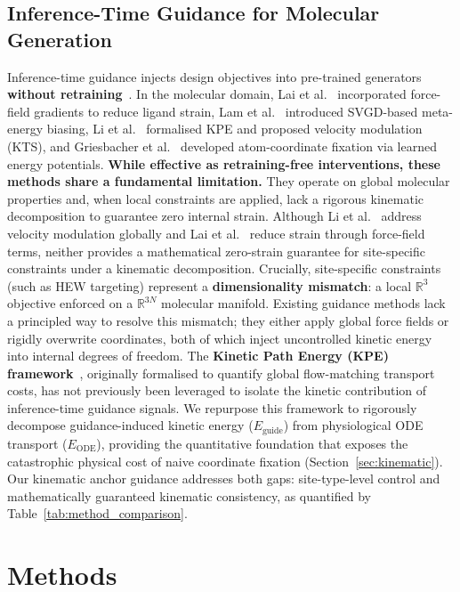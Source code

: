 \documentclass{article}
\newcommand{\reals}{\ensuremath{\mathbb{R}}}
\begin{document}
\subsection{Inference-Time Guidance for Molecular Generation}

Inference-time guidance injects design objectives into pre-trained
generators \textbf{without retraining}~\cite{dhariwal2021classifier,ho2022cfg,bansal2023universal}.
In the molecular domain, Lai et al.~\cite{lai2025force} incorporated
force-field gradients to reduce ligand strain, Lam et
al.~\cite{lam2026metadiffusion} introduced SVGD-based meta-energy biasing,
Li et al.~\cite{li2026kpe} formalised KPE and proposed velocity modulation
(KTS), and Griesbacher et al.~\cite{griesbacher2026ebmol} developed
atom-coordinate fixation via learned energy potentials.
\textbf{While effective as retraining-free interventions, these methods
share a fundamental limitation.}  They operate on global molecular
properties and, when local constraints are applied, lack a rigorous
kinematic decomposition to guarantee zero internal strain.  Although Li et
al.~\cite{li2026kpe} address velocity modulation globally and Lai et
al.~\cite{lai2025force} reduce strain through force-field terms, neither
provides a mathematical zero-strain guarantee for site-specific constraints
under a kinematic decomposition.  Crucially, site-specific constraints
(such as HEW targeting) represent a \textbf{dimensionality mismatch}: a
local $\reals^3$ objective enforced on a $\reals^{3N}$ molecular
manifold.  Existing guidance methods lack a principled way to resolve this
mismatch; they either apply global force fields or rigidly overwrite
coordinates, both of which inject uncontrolled kinetic energy into internal
degrees of freedom.  The \textbf{Kinetic Path Energy (KPE)
framework}~\cite{li2026kpe}, originally formalised to quantify global
flow-matching transport costs, has not previously been leveraged to
isolate the kinetic contribution of inference-time guidance signals.  We
repurpose this framework to rigorously decompose guidance-induced kinetic
energy ($E_{\text{guide}}$) from physiological ODE transport
($E_{\text{ODE}}$), providing the quantitative foundation that exposes
the catastrophic physical cost of naive coordinate fixation
(Section~\ref{sec:kinematic}).
Our kinematic anchor guidance addresses both gaps: site-type-level control
and mathematically guaranteed kinematic consistency, as quantified by
Table~\ref{tab:method_comparison}.

\section{Methods}
\label{sec:methods}
\end{document}
